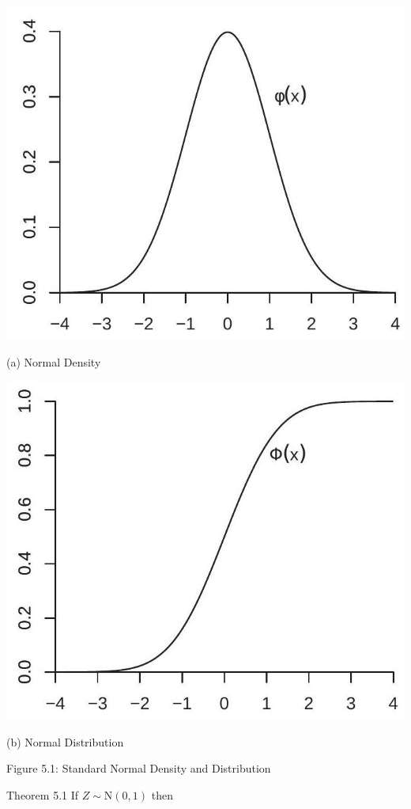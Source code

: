 \documentclass[10pt]{article}
\begin{document}
\includegraphics[max width=\textwidth]{2022_09_17_d221298fd653b1ce6adbg-02}

(a) Normal Density

\includegraphics[max width=\textwidth]{2022_09_17_d221298fd653b1ce6adbg-02(1)}

(b) Normal Distribution

Figure 5.1: Standard Normal Density and Distribution

Theorem 5.1 If $Z \sim \mathrm{N}(0,1)$ then
\end{document}
